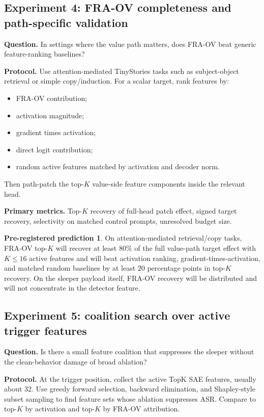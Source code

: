 \documentclass[11pt]{article}
\theoremstyle{definition}
\newtheorem{prediction}{Pre-registered prediction}
\theoremstyle{plain}
\theoremstyle{remark}
\begin{document}
\subsection{Experiment 4: FRA-OV completeness and path-specific validation}

\textbf{Question.} In settings where the value path matters, does FRA-OV beat generic
feature-ranking baselines?

\textbf{Protocol.}
Use attention-mediated TinyStories tasks such as subject-object retrieval or simple
copy/induction.  For a scalar target, rank features by:
\begin{itemize}
    \item FRA-OV contribution;
    \item activation magnitude;
    \item gradient times activation;
    \item direct logit contribution;
    \item random active features matched by activation and decoder norm.
\end{itemize}
Then path-patch the top-$K$ value-side feature components inside the relevant head.

\textbf{Primary metrics.} Top-$K$ recovery of full-head patch effect, signed target
recovery, selectivity on matched control prompts, unresolved budget size.

\begin{prediction}
On attention-mediated retrieval/copy tasks, FRA-OV top-$K$ will recover at least
$80\%$ of the full value-path target effect with $K\le 16$ active features and will
beat activation ranking, gradient-times-activation, and matched random baselines by
at least $20$ percentage points in top-$K$ recovery.  On the sleeper payload itself,
FRA-OV recovery will be distributed and will not concentrate in the detector feature.
\end{prediction}

\subsection{Experiment 5: coalition search over active trigger features}

\textbf{Question.} Is there a small feature coalition that suppresses the sleeper
without the clean-behavior damage of broad ablation?

\textbf{Protocol.}
At the trigger position, collect the active TopK SAE features, usually about 32.
Use greedy forward selection, backward elimination, and Shapley-style subset sampling
to find feature sets whose ablation suppresses ASR.  Compare to top-$K$ by activation
and top-$K$ by FRA-OV attribution.
\end{document}
